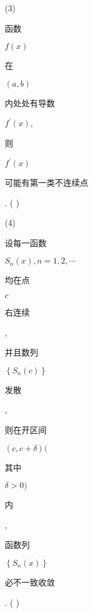 \documentclass[10pt]{article}
\begin{document}
(3) \begin{CJK}{UTF8}{mj}函数\end{CJK} $f(x)$ \begin{CJK}{UTF8}{mj}在\end{CJK} $(a, b)$ \begin{CJK}{UTF8}{mj}内处处有导数\end{CJK} $f^{\prime}(x)$, \begin{CJK}{UTF8}{mj}则\end{CJK} $f^{\prime}(x)$ \begin{CJK}{UTF8}{mj}可能有第一类不连续点\end{CJK}. ( )

(4) \begin{CJK}{UTF8}{mj}设每一函数\end{CJK} $S_{n}(x), n=1,2, \cdots$ \begin{CJK}{UTF8}{mj}均在点\end{CJK} $c$ \begin{CJK}{UTF8}{mj}右连续\end{CJK}, \begin{CJK}{UTF8}{mj}并且数列\end{CJK} $\left\{S_{n}(c)\right\}$ \begin{CJK}{UTF8}{mj}发散\end{CJK}, \begin{CJK}{UTF8}{mj}则在开区间\end{CJK} $(c, c+\delta)($ \begin{CJK}{UTF8}{mj}其中\end{CJK} $\delta>0)$ \begin{CJK}{UTF8}{mj}内\end{CJK}, \begin{CJK}{UTF8}{mj}函数列\end{CJK} $\left\{S_{n}(x)\right\}$ \begin{CJK}{UTF8}{mj}必不一致收敛\end{CJK}. ( )
\end{document}
